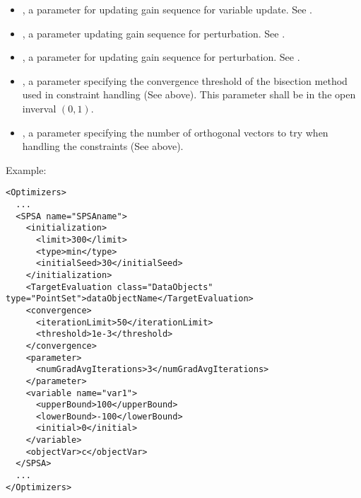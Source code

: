 \begin{itemize}
\begin{itemize}
  \item {},  a parameter for updating gain sequence for variable update. See \cite{spall1998implementation}.
  \item {},  a parameter updating gain sequence for perturbation. See \cite{spall1998implementation}.
  \item {},  a parameter for updating gain sequence for perturbation. See \cite{spall1998implementation}.
  \item {},  a parameter specifying the convergence threshold of the bisection method used in constraint handling (See above). This parameter shall be in the open inverval $(0,1)$.
  \item {},  a parameter specifying the number of orthogonal vectors to try when handling the constraints (See above).
  \end{itemize}
\end{itemize}


Example:
\begin{lstlisting}[style=XML]
<Optimizers>
  ...
  <SPSA name="SPSAname">
    <initialization>
      <limit>300</limit>
      <type>min</type>
      <initialSeed>30</initialSeed>
    </initialization>
    <TargetEvaluation class="DataObjects" type="PointSet">dataObjectName</TargetEvaluation>
    <convergence>
      <iterationLimit>50</iterationLimit>
      <threshold>1e-3</threshold>
    </convergence>
    <parameter>
      <numGradAvgIterations>3</numGradAvgIterations>
    </parameter>
    <variable name="var1">
      <upperBound>100</upperBound>
      <lowerBound>-100</lowerBound>
      <initial>0</initial>
    </variable>
    <objectVar>c</objectVar>
  </SPSA>
  ...
</Optimizers>
\end{lstlisting}
